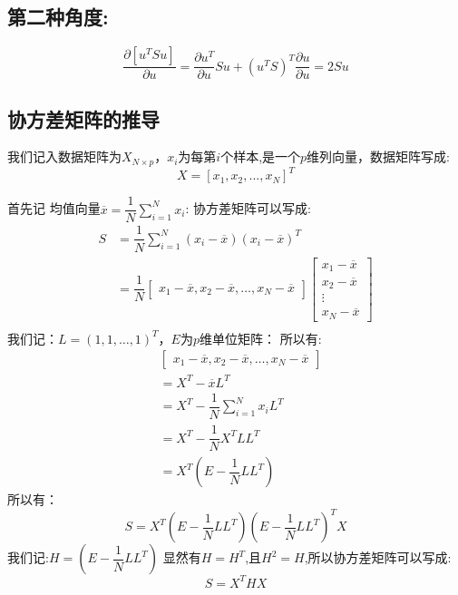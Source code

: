 \documentclass[withoutpreface,bwprint]{cumcmthesis} %
\begin{document}
\subsection{第二种角度:}
	\begin{equation}
		\frac{\partial \left[u^T S u\right]}{\partial u}=\frac{\partial u^T}{\partial u} Su 
		+ 
		\left( u^TS \right)^T \frac{\partial u}{\partial u}=2Su
	\end{equation}
\subsection{协方差矩阵的推导}
	我们记入数据矩阵为$X_{N\times p}$，$x_i$为每第$i$个样本,是一个$p$维列向量，数据矩阵写成:
	\begin{equation}
		X=\left[
			x_1,x_2,...,x_N
		\right]^T
	\end{equation}
	
	首先记 均值向量$\overline{x}=\dfrac{1}{N} \sum_{i=1}^{N} x_i$:
	协方差矩阵可以写成:
	\begin{align*}
		S
		&=\dfrac{1}{N} \sum_{i=1}^{N} (x_i-\overline{x})(x_i-\overline{x})^T\\
		&=\dfrac{1}{N} \left[\begin{array}{cccc}
		x_1-\overline{x},x_2-\overline{x},\ldots,x_N-\overline{x} \end{array}\right]
		 \left[\begin{array}{c}
				x_1-\overline{x}\\
				x_2-\overline{x}\\
				\vdots\\
				x_N-\overline{x} 
		\end{array}\right]\\
	\end{align*}
	我们记：$L=(1,1,\ldots,1)^T$，$E$为$p$维单位矩阵：
	所以有:
	\begin{align*}
		&\left[\begin{array}{cccc}x_1-\overline{x},x_2-\overline{x},\ldots,x_N-\overline{x} \end{array}\right]\\
		&=X^T-\overline{x}L^T\\
		&=X^T - \dfrac{1}{N} \sum_{i=1}^{N} x_i L^T\\
		&=X^T- \dfrac{1}{N} X^T LL^T\\
		&=X^T(E-\dfrac{1}{N} LL^T)		
	\end{align*}
	所以有：
	\begin{equation}
		S=X^T (E-\dfrac{1}{N} LL^T) (E-\dfrac{1}{N} LL^T) ^T X
	\end{equation}
	我们记:$H=(E-\dfrac{1}{N} LL^T)$
	显然有$H=H^T$,且$H^2=H$,所以协方差矩阵可以写成:
	\begin{equation}
		S=X^THX
	\end{equation} 
\end{document}
